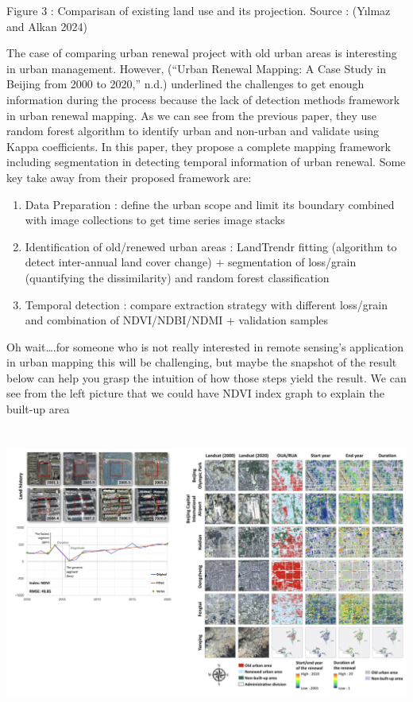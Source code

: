 \documentclass[
  letterpaper,
  DIV=11,
  numbers=noendperiod]{scrreprt}
\providecommand{\tightlist}{%
  \setlength{\itemsep}{0pt}\setlength{\parskip}{0pt}}\usepackage{longtable,booktabs,array}
\begin{document}
Figure 3 : Comparisan of existing land use and its projection. Source :
(Yılmaz and Alkan 2024)

The case of comparing urban renewal project with old urban areas is
interesting in urban management. However, ({``Urban Renewal Mapping: A
Case Study in Beijing from 2000 to 2020,''} n.d.) underlined the
challenges to get enough information during the process because the lack
of detection methods framework in urban renewal mapping. As we can see
from the previous paper, they use random forest algorithm to identify
urban and non-urban and validate using Kappa coefficients. In this
paper, they propose a complete mapping framework including segmentation
in detecting temporal information of urban renewal. Some key take away
from their proposed framework are:

\begin{enumerate}
\def\labelenumi{\arabic{enumi}.}
\tightlist
\item
  Data Preparation : define the urban scope and limit its boundary
  combined with image collections to get time series image stacks
\item
  Identification of old/renewed urban areas : LandTrendr fitting
  (algorithm to detect inter-annual land cover change) + segmentation of
  loss/grain (quantifying the dissimilarity) and random forest
  classification
\item
  Temporal detection : compare extraction strategy with different
  loss/grain and combination of NDVI/NDBI/NDMI + validation samples
\end{enumerate}

Oh wait\ldots.for someone who is not really interested in remote
sensing's application in urban mapping this will be challenging, but
maybe the snapshot of the result below can help you grasp the intuition
of how those steps yield the result. We can see from the left picture
that we could have NDVI index graph to explain the built-up area

\hypertarget{section}{%
\section{\texorpdfstring{\protect\includegraphics[width=7.83333in,height=\textheight]{images/clipboard-2246403998.png}}{}}\label{section}}
\end{document}
